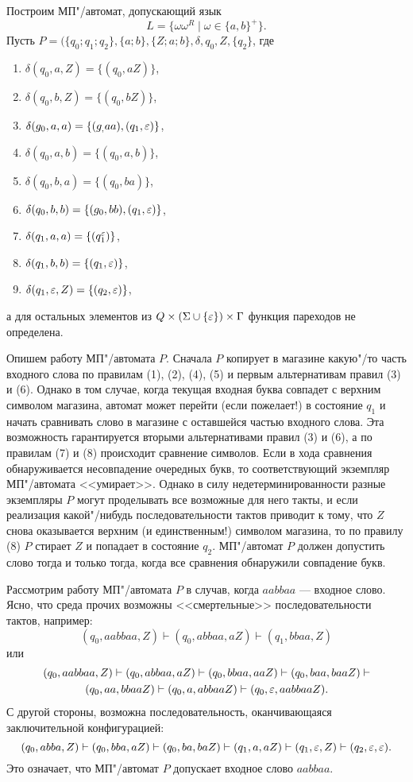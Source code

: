 \begin{myexample}
Построим МП"/автомат, допускающий язык
\[
L = \{\omega\omega^R\mid\omega\in\{a,b\}^+\}.
\]
Пусть $P=(\{q_0;q_1;q_2\},\{a;b\},\{Z;a;b\},\delta,q_0,Z,\{q_2\}$, где
\begin{enumerate}
\item $\delta(q_0,a,Z) = \{(q_0,aZ)\}$,
\item $\delta(q_0,b,Z) = \{(q_0,bZ)\}$,
\item $\delta(g_0,a,a) = \{(g_,aa),(q_1,\varepsilon)\}$,
\item $\delta(q_0,a,b) = \{(q_0,a,b)\}$,
\item $\delta(q_0,b,a) = \{(q_0,ba)\}$,
\item $\delta(q_0,b,b) = \{(g_0,bb),(q_1,\varepsilon)\}$,
\item $\delta(q_1,a,a) = \{(q_1^\varepsilon)\}$,
\item $\delta(q_1,b,b) = \{(q_1,\varepsilon)\}$,
\item $\delta(q_1,\varepsilon,Z) = \{(q_2,\varepsilon)\}$,
\end{enumerate}
а для остальных элементов из $Q\times(\Sigma\cup\{\varepsilon\})\times\Gamma$ функция пареходов не определена.

Опишем работу МП"/автомата $P$. Сначала $P$ копирует в магазине какую"/то часть входного слова по правилам (1), (2), (4), (5) и первым альтернативам правил (3) и (6). Однако в том случае, когда текущая входная буква совпадет с верхним символом магазина, автомат может перейти (если пожелает!) в состояние $q_1$ и начать сравнивать слово в магазине с оставшейся частью входного слова. Эта возможность гарантируется вторыми альтернативами правил (3) и (6), а по правилам (7) и (8) происходит сравнение символов. Если в хода сравнения обнаруживается несовпадение очередных букв, то соответствующий экземпляр МП"/автомата <<умирает>>. Однако в силу недетерминированности разные экземпляры $P$ могут проделывать все возможные для него такты, и если реализация какой"/нибудь последовательности тактов приводит к тому, что $Z$ снова оказывается верхним (и единственным!) символом магазина, то по правилу (8) $P$ стирает $Z$ и попадает в состояние $q_2$. МП"/автомат $P$ должен допустить слово тогда и только тогда, когда все сравнения обнаружили совпадение букв.

Рассмотрим работу МП"/автомата $P$ в случав, когда $aabbaa$ --- входное слово. Ясно, что среда прочих возможны <<смертельные>> последовательности тактов, например:
\[
(q_0,aabbaa,Z) \vdash (q_0,abbaa,aZ) \vdash (q_1,bbaa,Z)
\]
или
\begin{multline*}
(q_0,aabbaa,Z) \vdash (q_0,abbaa,aZ) \vdash (q_0,bbaa,aaZ) \vdash (q_0,baa,baaZ) \vdash \\ (q_0,aa,bbaaZ) \vdash (q_0,a,abbaaZ) \vdash (q_0,\varepsilon,aabbaaZ).
\end{multline*}
С другой стороны, возможна последовательность, оканчивающаяся заключительной конфигурацией:
\[
(q_0,abba,Z) \vdash (q_0,bba,aZ) \vdash (q_0,ba,baZ) \vdash (q_1,a,aZ) \vdash (q_1,\varepsilon,Z) \vdash (q_2,\varepsilon,\varepsilon).
\]
Это означает, что МП"/автомат $P$ допускает входное слово $aabbaa$.


\end{myexample}

